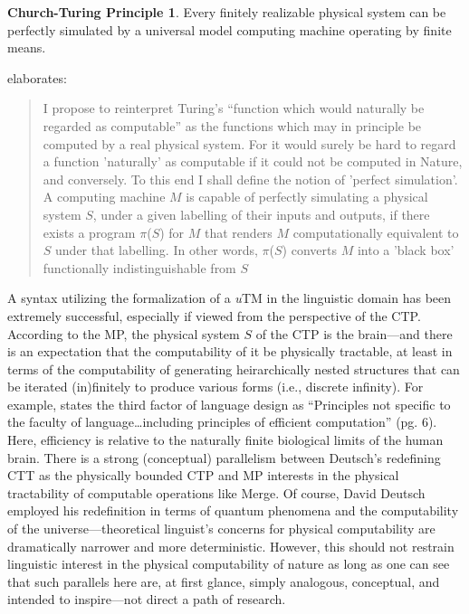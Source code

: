 \documentclass[11pt,twoside]{article}
\theoremstyle{plain}
\numberwithin{equation}{section}
\theoremstyle{definition}
\newtheorem{phrase string}{Phrase String}
\begin{document}
\newtheorem*{ctprinciple}{Church-Turing Principle}
\begin{ctprinciple}
Every finitely realizable physical system can be perfectly simulated by a universal model computing machine operating by finite means.
\end{ctprinciple}

\cite[100]{deutsch:1985} elaborates:  
\begin{quotation}
I propose to reinterpret Turing's ``function which would naturally be regarded as computable'' as the functions which may in principle be computed by a real 	physical system. For it would surely be hard to regard a function 'naturally' as	computable if it could not be computed in Nature, and conversely. To this end I shall define the notion of 'perfect simulation'. A computing machine $M$ is capable of perfectly simulating a physical system $S$, under a given labelling of their inputs and outputs, if there exists a program $\pi$($S$) for $M$ that renders $M$ computationally equivalent to $S$ under that labelling. In other words, $\pi$($S$) converts $M$ into a 'black box' functionally indistinguishable from $S$
\end{quotation}

A syntax utilizing the formalization of a \textsl{u}TM in the linguistic domain has been extremely successful, especially if viewed from the perspective of the CTP. According to the MP, the physical system $S$ of the CTP is the brain---and there is an expectation that the computability of it be physically tractable, at least in terms of the computability of generating heirarchically nested structures that can be iterated (in)finitely to produce various forms (i.e., discrete infinity). For example, \cite{chomsky05threefactors} states the third factor of language design as ``Principles not specific to the faculty of language\ldots including principles of efficient computation'' (pg. 6). Here, efficiency is relative to the naturally finite biological limits of the human brain. There is a strong (conceptual) parallelism between Deutsch's redefining CTT as the physically bounded CTP and MP interests in the physical tractability of computable operations like Merge. Of course, David Deutsch employed his redefinition in terms of quantum phenomena and the computability of the universe---theoretical linguist's concerns for physical computability are dramatically narrower and more deterministic. However, this should not restrain linguistic interest in the physical computability of nature as long as one can see that such parallels here are, at first glance, simply analogous, conceptual, and intended to inspire---not direct a path of research.  
\end{document}
